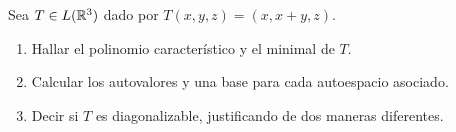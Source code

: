 \item Sea $T\in L(\mathbb{R}^3)$ dado por $T(x,y,z)=(x,x+y,z)$.
    \begin{enumerate}
        \item Hallar el polinomio característico y el minimal de $T$.
            \begin{mdframed}[style=s]
                
            \end{mdframed}
        \item Calcular los autovalores y una base para cada autoespacio asociado.
            \begin{mdframed}[style=s]
                
            \end{mdframed}
        \item Decir si $T$ es diagonalizable, justificando de dos maneras diferentes.
            \begin{mdframed}[style=s]
                
            \end{mdframed}
    \end{enumerate}